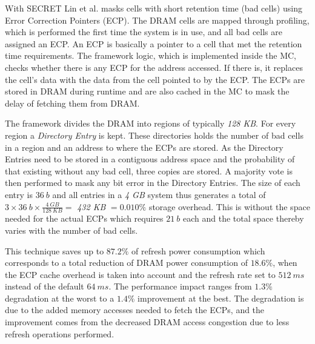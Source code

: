 With SECRET Lin et al. \cite{secret} masks cells with short retention time (bad cells) using Error Correction Pointers (ECP). The DRAM cells are mapped through profiling, which is performed the first time the system is in use, and all bad cells are assigned an ECP. An ECP is basically a pointer to a cell that met the retention time requirements. The framework logic, which is implemented inside the MC, checks whether there is any ECP for the address accessed. If there is, it replaces the cell's data with the data from the cell pointed to by the ECP. The ECPs are stored in DRAM during runtime and are also cached in the MC to mask the delay of fetching them from DRAM.

The framework divides the DRAM into regions of typically \textit{128 KB}. For every region a \textit{Directory Entry} is kept. These directories holds the number of bad cells in a region and an address to where the ECPs are stored. As the Directory Entries need to be stored in a contiguous address space and the probability of that existing without any bad cell, three copies are stored. A majority vote is then performed to mask any bit error in the Directory Entries. The size of each entry is $36\:b$ and all entries in a \textit{4 GB} system thus generates a total of $3 \times 36\:b \times \frac{4\:GB}{128\:KB} =$ \textit{432 KB} $= 0.010\%$ storage overhead. This is without the space needed for the actual ECPs which requires $21\:b$ each and the total space thereby varies with the number of bad cells. 

This technique saves up to $87.2\%$ of refresh power consumption which corresponds to a total reduction of DRAM power consumption of $18.6\%$, when the ECP cache overhead is taken into account and the refresh rate set to $512\:ms$ instead of the default $64\:ms$. The performance impact ranges from $1.3\%$ degradation at the worst to a $1.4\%$ improvement at the best. The degradation is due to the added memory accesses needed to fetch the ECPs, and the  improvement comes from the decreased DRAM access congestion due to less refresh operations performed.